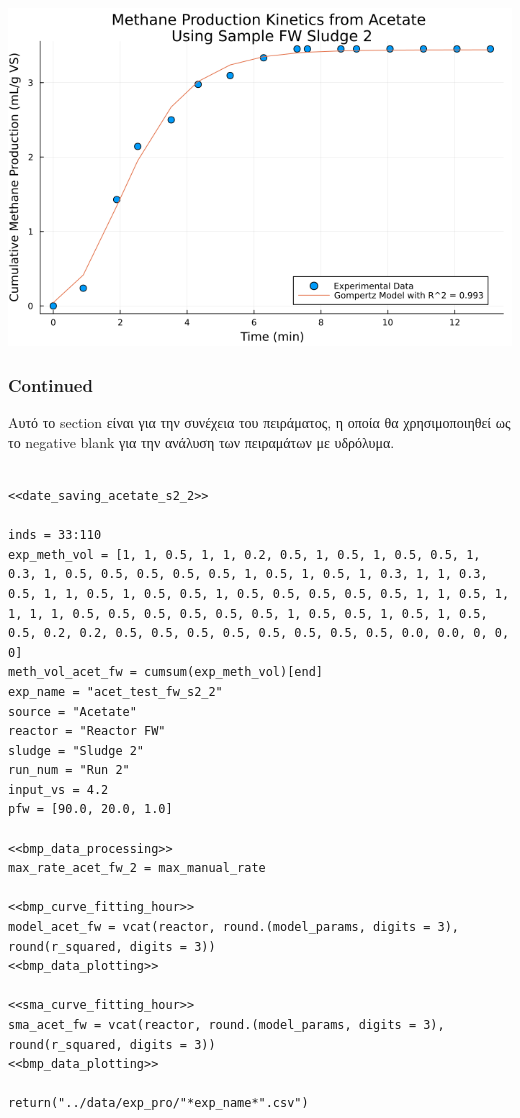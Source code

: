\documentclass[11pt]{article}
\begin{document}
\begin{center}
\includegraphics[width=.9\linewidth]{../plots/BMPs/Acetate/specific_methane_kinetics_acet_test_fw_s2.png}
\end{center}

\subsubsection{Continued}
\label{sec:org1715897}
Αυτό το section είναι για την συνέχεια του πειράματος, η οποία θα χρησιμοποιηθεί ως το negative blank για την ανάλυση των πειραμάτων με υδρόλυμα.

\begin{verbatim}

<<date_saving_acetate_s2_2>>

inds = 33:110
exp_meth_vol = [1, 1, 0.5, 1, 1, 0.2, 0.5, 1, 0.5, 1, 0.5, 0.5, 1, 0.3, 1, 0.5, 0.5, 0.5, 0.5, 0.5, 1, 0.5, 1, 0.5, 1, 0.3, 1, 1, 0.3, 0.5, 1, 1, 0.5, 1, 0.5, 0.5, 1, 0.5, 0.5, 0.5, 0.5, 0.5, 1, 1, 0.5, 1, 1, 1, 1, 0.5, 0.5, 0.5, 0.5, 0.5, 0.5, 1, 0.5, 0.5, 1, 0.5, 1, 0.5, 0.5, 0.2, 0.2, 0.5, 0.5, 0.5, 0.5, 0.5, 0.5, 0.5, 0.5, 0.0, 0.0, 0, 0, 0]
meth_vol_acet_fw = cumsum(exp_meth_vol)[end]
exp_name = "acet_test_fw_s2_2"
source = "Acetate"
reactor = "Reactor FW"
sludge = "Sludge 2"
run_num = "Run 2"
input_vs = 4.2
pfw = [90.0, 20.0, 1.0]

<<bmp_data_processing>>
max_rate_acet_fw_2 = max_manual_rate

<<bmp_curve_fitting_hour>>
model_acet_fw = vcat(reactor, round.(model_params, digits = 3), round(r_squared, digits = 3))
<<bmp_data_plotting>>

<<sma_curve_fitting_hour>>
sma_acet_fw = vcat(reactor, round.(model_params, digits = 3), round(r_squared, digits = 3))  
<<bmp_data_plotting>>

return("../data/exp_pro/"*exp_name*".csv")

\end{verbatim}
\end{document}
